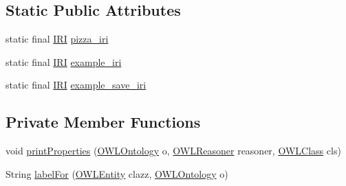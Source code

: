 \subsection*{Static Public Attributes}
\begin{DoxyCompactItemize}
\item 
static final \hyperlink{classorg_1_1semanticweb_1_1owlapi_1_1model_1_1_i_r_i}{I\-R\-I} \hyperlink{classuk_1_1ac_1_1manchester_1_1owl_1_1owlapi_1_1tutorialowled2011_1_1_tutorial_snippets_a9f2596762ef3f1c3438d60fc30715820}{pizza\-\_\-iri}
\item 
static final \hyperlink{classorg_1_1semanticweb_1_1owlapi_1_1model_1_1_i_r_i}{I\-R\-I} \hyperlink{classuk_1_1ac_1_1manchester_1_1owl_1_1owlapi_1_1tutorialowled2011_1_1_tutorial_snippets_ab73ac8906919fa7b45cde03568816030}{example\-\_\-iri}
\item 
static final \hyperlink{classorg_1_1semanticweb_1_1owlapi_1_1model_1_1_i_r_i}{I\-R\-I} \hyperlink{classuk_1_1ac_1_1manchester_1_1owl_1_1owlapi_1_1tutorialowled2011_1_1_tutorial_snippets_a735cb283c996be53d4364c8d09f87148}{example\-\_\-save\-\_\-iri}
\end{DoxyCompactItemize}
\subsection*{Private Member Functions}
\begin{DoxyCompactItemize}
\item 
void \hyperlink{classuk_1_1ac_1_1manchester_1_1owl_1_1owlapi_1_1tutorialowled2011_1_1_tutorial_snippets_a18e2ae04d2dc1cd8a27ed4ed46e2376f}{print\-Properties} (\hyperlink{interfaceorg_1_1semanticweb_1_1owlapi_1_1model_1_1_o_w_l_ontology}{O\-W\-L\-Ontology} o, \hyperlink{interfaceorg_1_1semanticweb_1_1owlapi_1_1reasoner_1_1_o_w_l_reasoner}{O\-W\-L\-Reasoner} reasoner, \hyperlink{interfaceorg_1_1semanticweb_1_1owlapi_1_1model_1_1_o_w_l_class}{O\-W\-L\-Class} cls)
\item 
String \hyperlink{classuk_1_1ac_1_1manchester_1_1owl_1_1owlapi_1_1tutorialowled2011_1_1_tutorial_snippets_a7636b705fee8542155676225ffb336d8}{label\-For} (\hyperlink{interfaceorg_1_1semanticweb_1_1owlapi_1_1model_1_1_o_w_l_entity}{O\-W\-L\-Entity} clazz, \hyperlink{interfaceorg_1_1semanticweb_1_1owlapi_1_1model_1_1_o_w_l_ontology}{O\-W\-L\-Ontology} o)
\end{DoxyCompactItemize}


